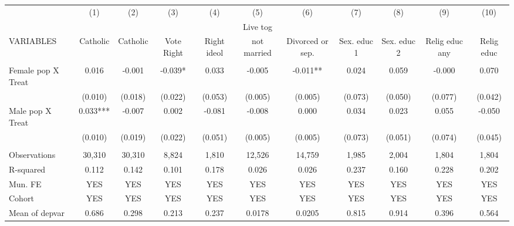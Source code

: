 \begin{tabular}{lcccccccccc} \hline
 & (1) & (2) & (3) & (4) & (5) & (6) & (7) & (8) & (9) & (10) \\
 &  &  &  &  & Live tog &  &  &  &  &  \\
VARIABLES & Catholic & Catholic & Vote Right & Right ideol & not married & Divorced or sep. & Sex. educ 1 & Sex. educ 2 & Relig educ any & Relig educ \\ \hline
 &  &  &  &  &  &  &  &  &  &  \\
Female pop X Treat & 0.016 & -0.001 & -0.039* & 0.033 & -0.005 & -0.011** & 0.024 & 0.059 & -0.000 & 0.070 \\
 & (0.010) & (0.018) & (0.022) & (0.053) & (0.005) & (0.005) & (0.073) & (0.050) & (0.077) & (0.042) \\
Male pop X Treat & 0.033*** & -0.007 & 0.002 & -0.081 & -0.008 & 0.000 & 0.034 & 0.023 & 0.055 & -0.050 \\
 & (0.010) & (0.019) & (0.022) & (0.051) & (0.005) & (0.005) & (0.073) & (0.051) & (0.074) & (0.045) \\
 &  &  &  &  &  &  &  &  &  &  \\
Observations & 30,310 & 30,310 & 8,824 & 1,810 & 12,526 & 14,759 & 1,985 & 2,004 & 1,804 & 1,804 \\
R-squared & 0.112 & 0.142 & 0.101 & 0.178 & 0.026 & 0.026 & 0.237 & 0.160 & 0.228 & 0.202 \\
Mun. FE & YES & YES & YES & YES & YES & YES & YES & YES & YES & YES \\
Cohort & YES & YES & YES & YES & YES & YES & YES & YES & YES & YES \\
 Mean of depvar & 0.686 & 0.298 & 0.213 & 0.237 & 0.0178 & 0.0205 & 0.815 & 0.914 & 0.396 & 0.564 \\ \hline
\end{tabular}
